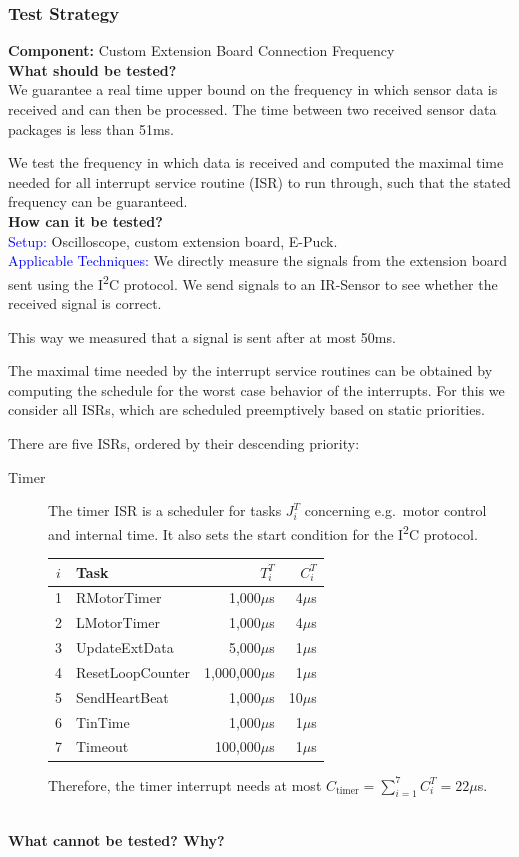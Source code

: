 \documentclass[a4paper,parskip,headheight=38pt]{scrartcl} %
\newcommand{\teststrat}[5]{
    \subsubsection{Test Strategy}
	\textbf{Component:} #1 \\
	\noindent\textbf{What should be tested?} \\
    \noindent #2 \\
	\noindent\textbf{How can it be tested?} \\
    \noindent\textcolor{blue}{Setup:} #3 \\
    \noindent\textcolor{blue}{Applicable Techniques:} #4 \\
	\noindent\textbf{What cannot be tested? Why?} \\
    \noindent #5
}
\newcommand{\mics}{$\mu$s}
\begin{document}
\teststrat{Custom Extension Board Connection Frequency}{
    We guarantee a real time upper bound on the frequency in which sensor data
    is received and can then be processed. The time between two received
    sensor data packages is less than 51ms.

    We test the frequency in which data is received and computed the maximal
    time needed for all interrupt service routine (ISR) to run through, such
    that the
    stated frequency can be guaranteed.
}{
    Oscilloscope, custom extension board, E-Puck.
}{
    We directly measure the signals from the extension board sent using the
    I\textsuperscript{2}C protocol. We send signals to an IR-Sensor to see
    whether the received signal is correct.

    This way we measured that a signal is sent after at most 50ms. 

    The maximal time needed by the interrupt service routines can be obtained by
    computing the schedule for the worst case behavior of the interrupts. For
    this we consider all ISRs, which are scheduled preemptively based on
    static priorities.

    There are five ISRs, ordered by their descending priority:
    \begin{description}
        \item[Timer] The timer ISR is a scheduler for tasks $J^T_i$ concerning
            e.g.\ motor control and internal time. It also sets the start
            condition for the I\textsuperscript{2}C protocol.\\
            \begin{center}
            \begin{tabular}{c | l | r | r}
                $i$ & Task & $T^T_i$ & $C^T_i$ \\
                \hline
                1 & RMotorTimer         & 1,000\mics     & 4\mics \\
                2 & LMotorTimer         & 1,000\mics     & 4\mics \\
                3 & UpdateExtData       & 5,000\mics     & 1\mics \\
                4 & ResetLoopCounter    & 1,000,000\mics & 1\mics \\
                5 & SendHeartBeat       & 1,000\mics     & 10\mics \\
                6 & TinTime             & 1,000\mics     & 1\mics \\
                7 & Timeout             & 100,000\mics   & 1\mics \\
            \end{tabular}
            \end{center}
            Therefore, the timer interrupt needs at most $C_{\text{timer}}
            = \sum_{i = 1}^{7}C^T_i = 22$\mics.


\end{description}}
\end{document}
